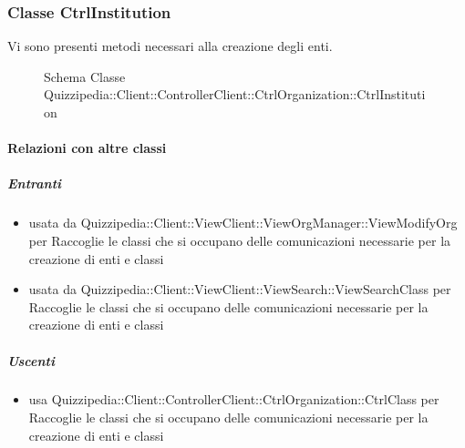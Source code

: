 \subsubsection{Classe CtrlInstitution}
Vi sono presenti metodi necessari alla creazione degli enti.
\begin{figure}[H]
\centering
\noindent{}
\caption[Schema Classe CtrlInstitution]{Schema Classe Quizzipedia::Client::ControllerClient::CtrlOrganization::CtrlInstitution}
\end{figure}
\paragraph{Relazioni con altre classi}
\subparagraph{Entranti}
\begin{itemize}
\item usata da Quizzipedia::Client::ViewClient::ViewOrgManager::ViewModifyOrg per Raccoglie le classi che si occupano delle comunicazioni necessarie per la creazione di enti e classi
\item usata da Quizzipedia::Client::ViewClient::ViewSearch::ViewSearchClass per Raccoglie le classi che si occupano delle comunicazioni necessarie per la creazione di enti e classi
\end{itemize}
\subparagraph{Uscenti}
\begin{itemize}
\item usa Quizzipedia::Client::ControllerClient::CtrlOrganization::CtrlClass per Raccoglie le classi che si occupano delle comunicazioni necessarie per la creazione di enti e classi
\end{itemize}
